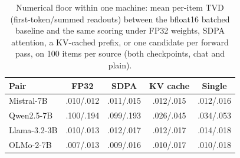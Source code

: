 \begin{table}[t]
\centering\scriptsize
\setlength{\tabcolsep}{3pt}
\begin{tabular}{@{}lcccc@{}}
\toprule
Pair & FP32 & SDPA & KV cache & Single \\
\midrule
Mistral-7B & .010/.012 & .011/.015 & .012/.015 & .012/.016 \\
Qwen2.5-7B & .100/.194 & .099/.193 & .026/.045 & .034/.053 \\
Llama-3.2-3B & .010/.013 & .012/.017 & .012/.017 & .014/.018 \\
OLMo-2-7B & .007/.013 & .009/.016 & .010/.017 & .010/.018 \\
\bottomrule
\end{tabular}
\caption{Numerical floor within one machine: mean per-item TVD (first-token/summed readouts) between the bfloat16 batched baseline and the same scoring under FP32 weights, SDPA attention, a KV-cached prefix, or one candidate per forward pass, on 100 items per source (both checkpoints, chat and plain).}
\label{tab:e0b}
\end{table}
